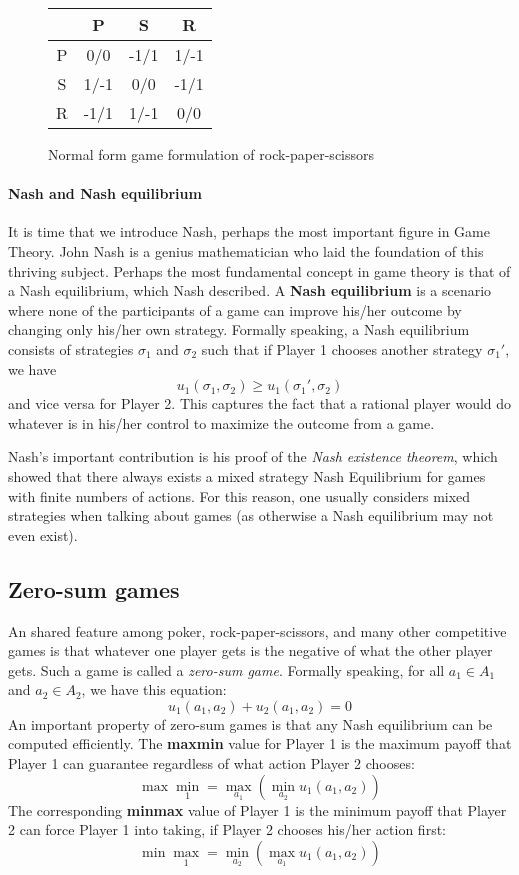 \documentclass[10pt,a4paper]{article}
\begin{document}
\begin{figure}[ht]
	\centering
	\begin{tabular}{|c|c|c|c|}
		\hline
		  & P    & S    & R    \\ \hline
		P & 0/0  & -1/1 & 1/-1 \\ \hline
		S & 1/-1 & 0/0  & -1/1 \\ \hline
		R & -1/1 & 1/-1 & 0/0  \\ \hline
	\end{tabular}
	\caption{Normal form game formulation of rock-paper-scissors}
	\label{figure:RPS}
\end{figure}

\paragraph{Nash and Nash equilibrium}
It is time that we introduce Nash, perhaps the most important figure in Game Theory. John Nash is a genius mathematician who laid the foundation of this thriving subject.  Perhaps the most fundamental concept in game theory is that of a Nash equilibrium, which Nash described. A \textbf{Nash equilibrium} is a scenario where none of the participants of a game can improve his/her outcome by changing only his/her own strategy. Formally speaking, a Nash equilibrium consists of strategies $\sigma_1$ and $\sigma_2$ such that if Player 1 chooses another strategy $\sigma_1'$, we have
$$
	u_1(\sigma_1, \sigma_2) \geq u_1(\sigma_1', \sigma_2)
$$
and vice versa for Player 2. This captures the fact that a rational player would do whatever is in his/her control to maximize the outcome from a game.

Nash's important contribution is his proof of the \textit{Nash existence theorem}, which showed that there always exists a mixed strategy Nash Equilibrium for games with finite numbers of actions. For this reason, one usually considers mixed strategies when talking about games (as otherwise a Nash equilibrium may not even exist).

\subsection{Zero-sum games}
An shared feature among poker, rock-paper-scissors, and many other competitive games is that whatever one player gets is the negative of what the other player gets. Such a game is called a \textit{zero-sum game}. Formally speaking, for all $a_1 \in A_1$ and $a_2 \in A_2$, we have this equation:
$$
	u_1(a_1, a_2) + u_2(a_1, a_2) = 0
$$
An important property of zero-sum games is that any Nash equilibrium can be computed efficiently. The \textbf{maxmin} value for Player 1 is the maximum payoff that Player 1 can guarantee regardless of what action Player 2 chooses:
$$
	\max\min_1 = \max_{a_1}(\min_{a_{2}} u_1(a_1, a_{2}))
$$
The corresponding \textbf{minmax} value of Player 1 is the minimum payoff that Player 2 can force Player 1 into taking, if Player 2 chooses his/her action first:
$$
	\min\max_1 = \min_{a_2}(\max_{a_{1}} u_1(a_1, a_{2}))
$$
\end{document}
